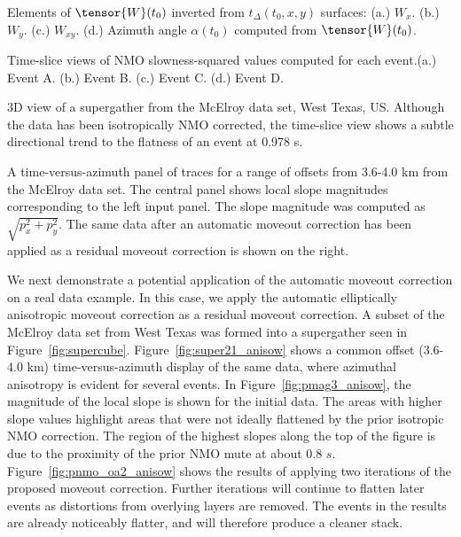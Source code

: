 {Elements of $\tensor{W}(t_0)$ inverted from $t_{\Delta }(t_0,x,y)$ surfaces: (a.) $W_x$. (b.) $W_y$. (c.) $W_{xy}$.  (d.) Azimuth angle $\alpha (t_0)$ computed from $\tensor{W}(t_0)$.}

{Time-slice views of NMO slowness-squared values computed for each event.(a.) Event A. (b.) Event B. (c.) Event C. (d.) Event D.}

{3D view of a supergather from the McElroy data set, West Texas, US. Although the data has been isotropically NMO corrected, the time-slice view shows a subtle directional trend to the flatness of an event at 0.978 s.}

{A time-versus-azimuth panel of traces for a range of offsets from 3.6-4.0 km from the McElroy data set. The central panel shows local slope magnitudes corresponding to the left input panel. The slope magnitude was computed as $\sqrt{p_x^2+p_y^2}$.   The same data after an automatic moveout correction has been applied as a residual moveout correction is shown on the right.}

We next demonstrate a potential application of the automatic moveout correction on a real data example.  In this case, we apply the automatic elliptically anisotropic moveout correction as a residual moveout correction.  A subset of the McElroy data set from West Texas was formed into a supergather seen in Figure~\ref{fig:supercube}.  Figure~\ref{fig:super21_anisow} shows a common offset (3.6-4.0 km) time-versus-azimuth display of the same data, where azimuthal anisotropy is evident for several events. In Figure~\ref{fig:pmag3_anisow}, the magnitude of the local slope is shown for the initial data.  The areas with higher slope values highlight areas that were not ideally flattened by the prior isotropic NMO correction. The region of the highest slopes along the top of the figure is due to the proximity of the prior NMO mute at about 0.8 $s$. Figure~\ref{fig:pnmo_oa2_anisow} shows the results of applying two iterations of the proposed moveout correction.  Further iterations will continue to flatten later events as distortions from overlying layers are removed.  The events in the results are already noticeably flatter, and will therefore produce a cleaner stack.    

